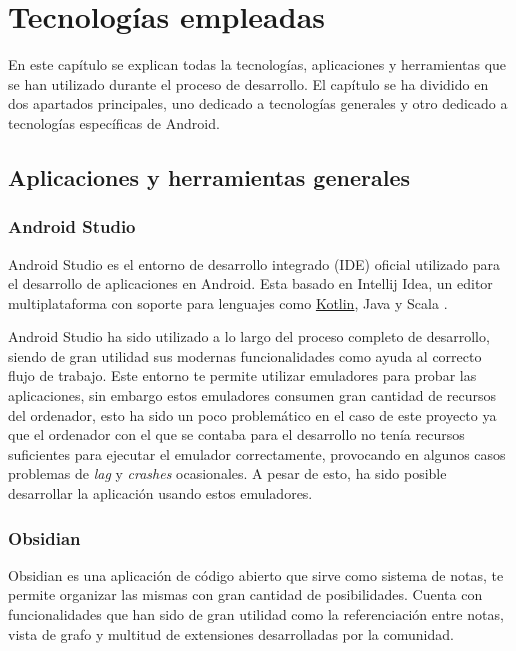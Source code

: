 \chapter{Tecnologías empleadas}
\label{cap:tecnologiasEmpleadas}
En este capítulo se explican todas la tecnologías, aplicaciones y herramientas que se han utilizado durante el proceso de desarrollo. El capítulo se ha dividido en dos apartados principales, uno dedicado a tecnologías generales y otro dedicado a tecnologías específicas de Android.

\section{Aplicaciones y herramientas generales}
\hypertarget{subsec:android_studio}{}
\subsection{Android Studio}
Android Studio\hyperlink{cap:biblio}{}
es el entorno de desarrollo integrado (IDE) oficial utilizado para el desarrollo de aplicaciones en Android. Esta basado en Intellij Idea\hyperlink{cap:biblio}{}, un editor multiplataforma con soporte para lenguajes como \hyperlink{subsec:kotlin}{Kotlin}, 
Java\hyperlink{cap:biblio}{} y Scala \hyperlink{cap:biblio}{}. 

Android Studio ha sido utilizado a lo largo del proceso completo de desarrollo, siendo de gran utilidad sus modernas funcionalidades como ayuda al correcto flujo de trabajo. Este entorno te permite utilizar emuladores para probar las aplicaciones, sin embargo estos emuladores consumen gran cantidad de recursos del ordenador, esto ha sido un poco problemático en el caso de este proyecto ya que el ordenador con el que se contaba para el desarrollo no tenía recursos suficientes para ejecutar el emulador correctamente, provocando en algunos casos problemas de \textit{lag} y \textit{crashes} ocasionales. A pesar de esto, ha sido posible desarrollar la aplicación usando estos emuladores.

\subsection{Obsidian}
Obsidian\hyperlink{cap:biblio}{} es una aplicación de código abierto que sirve como sistema de notas, te permite organizar las mismas con gran cantidad de posibilidades. Cuenta con funcionalidades que han sido de gran utilidad como la referenciación entre notas, vista de grafo y multitud de extensiones desarrolladas por la comunidad.

